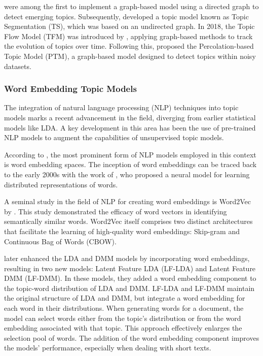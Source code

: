 \documentclass{article}
\begin{document}
\citet{cataldi_emerging_2010} were among the first to implement a graph-based model using a directed graph to detect emerging topics. Subsequently, \citet{de_arruda_topic_2016} developed a topic model known as Topic Segmentation (TS), which was based on an undirected graph. In 2018, the Topic Flow Model (TFM) was introduced by \citet{churchill_temporal_2018}, applying graph-based methods to track the evolution of topics over time. Following this, \citet{churchill_percolation-based_2020} proposed the Percolation-based Topic Model (PTM), a graph-based model designed to detect topics within noisy datasets.

\subsubsection{Word Embedding Topic Models}
The integration of natural language processing (NLP) techniques into topic models marks a recent advancement in the field, diverging from earlier statistical models like LDA. A key development in this area has been the use of pre-trained NLP models to augment the capabilities of unsupervised topic models.

According to \citet{almeida_word_2023}, the most prominent form of NLP models employed in this context is word embedding spaces. The inception of word embeddings can be traced back to the early 2000s with the work of \citet{bengio_neural_2000}, who proposed a neural model for learning distributed representations of words.

A seminal study in the field of NLP for creating word embeddings is Word2Vec by \citet{mikolov_efficient_2013}. This study demonstrated the efficacy of word vectors in identifying semantically similar words. Word2Vec itself comprises two distinct architectures that facilitate the learning of high-quality word embeddings: Skip-gram and Continuous Bag of Words (CBOW).

\citet{nguyen_improving_2015} later enhanced the LDA and DMM models by incorporating word embeddings, resulting in two new models: Latent Feature LDA (LF-LDA) and Latent Feature DMM (LF-DMM). In these models, they added a word embedding component to the topic-word distribution of LDA and DMM. LF-LDA and LF-DMM maintain the original structure of LDA and DMM, but integrate a word embedding for each word in their distributions. When generating words for a document, the model can select words either from the topic's distribution or from the word embedding associated with that topic. This approach effectively enlarges the selection pool of words. The addition of the word embedding component improves the models' performance, especially when dealing with short texts.
\end{document}
